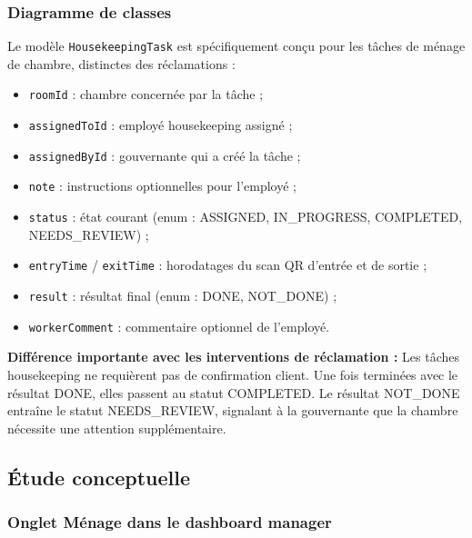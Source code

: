 
\subsubsection{Diagramme de classes}


Le modèle \texttt{HousekeepingTask} est spécifiquement conçu pour les tâches de ménage de chambre, distinctes des réclamations :
\begin{itemize}
  \item \texttt{roomId} : chambre concernée par la tâche ;
  \item \texttt{assignedToId} : employé housekeeping assigné ;
  \item \texttt{assignedById} : gouvernante qui a créé la tâche ;
  \item \texttt{note} : instructions optionnelles pour l'employé ;
  \item \texttt{status} : état courant (enum : ASSIGNED, IN\_PROGRESS, COMPLETED, NEEDS\_REVIEW) ;
  \item \texttt{entryTime} / \texttt{exitTime} : horodatages du scan QR d'entrée et de sortie ;
  \item \texttt{result} : résultat final (enum : DONE, NOT\_DONE) ;
  \item \texttt{workerComment} : commentaire optionnel de l'employé.
\end{itemize}

\textbf{Différence importante avec les interventions de réclamation :} Les tâches housekeeping ne requièrent pas de confirmation client. Une fois terminées avec le résultat DONE, elles passent au statut COMPLETED. Le résultat NOT\_DONE entraîne le statut NEEDS\_REVIEW, signalant à la gouvernante que la chambre nécessite une attention supplémentaire.

\subsection{Étude conceptuelle}

\subsubsection{Onglet Ménage dans le dashboard manager}

